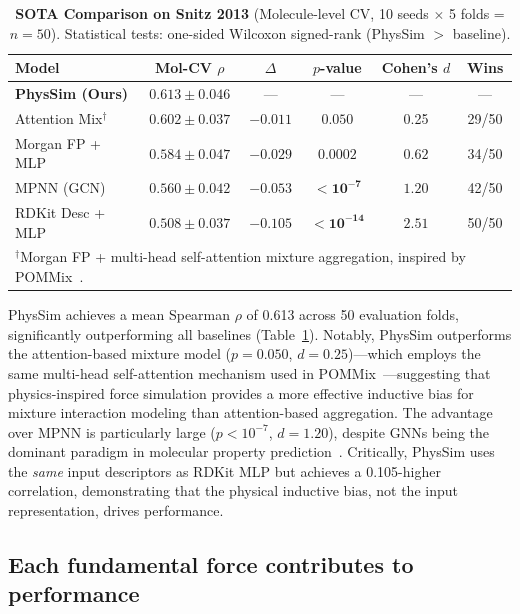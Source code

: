 \documentclass[11pt,a4paper]{article}
\begin{document}
\begin{table}[h]
\centering
\caption{\textbf{SOTA Comparison on Snitz 2013} (Molecule-level CV, 10 seeds $\times$ 5 folds = $n = 50$). Statistical tests: one-sided Wilcoxon signed-rank (PhysSim $>$ baseline).}
\label{tab:sota}
\begin{tabular}{lccccc}
\toprule
\textbf{Model} & \textbf{Mol-CV $\rho$} & \textbf{$\Delta$} & \textbf{$p$-value} & \textbf{Cohen's $d$} & \textbf{Wins} \\
\midrule
\textbf{PhysSim (Ours)} & $\mathbf{0.613 \pm 0.046}$ & --- & --- & --- & --- \\
Attention Mix$^\dagger$ & $0.602 \pm 0.037$ & $-0.011$ & $\mathbf{0.050}$ & 0.25 & 29/50 \\
Morgan FP + MLP & $0.584 \pm 0.047$ & $-0.029$ & $\mathbf{0.0002}$ & $\mathbf{0.62}$ & 34/50 \\
MPNN (GCN) & $0.560 \pm 0.042$ & $-0.053$ & $\mathbf{<10^{-7}}$ & $\mathbf{1.20}$ & 42/50 \\
RDKit Desc + MLP & $0.508 \pm 0.037$ & $-0.105$ & $\mathbf{<10^{-14}}$ & $\mathbf{2.51}$ & 50/50 \\
\bottomrule
\multicolumn{6}{l}{\footnotesize $^\dagger$Morgan FP + multi-head self-attention mixture aggregation, inspired by POMMix~\cite{nguyen2025pommix}.}
\end{tabular}
\end{table}

PhysSim achieves a mean Spearman $\rho$ of 0.613 across 50 evaluation folds, significantly outperforming all baselines (Table~\ref{tab:sota}). Notably, PhysSim outperforms the attention-based mixture model ($p = 0.050$, $d = 0.25$)---which employs the same multi-head self-attention mechanism used in POMMix~\cite{nguyen2025pommix}---suggesting that physics-inspired force simulation provides a more effective inductive bias for mixture interaction modeling than attention-based aggregation. The advantage over MPNN is particularly large ($p < 10^{-7}$, $d = 1.20$), despite GNNs being the dominant paradigm in molecular property prediction~\cite{gilmer2017}. Critically, PhysSim uses the \emph{same} input descriptors as RDKit MLP but achieves a 0.105-higher correlation, demonstrating that the physical inductive bias, not the input representation, drives performance.

\subsection{Each fundamental force contributes to performance}
\end{document}
